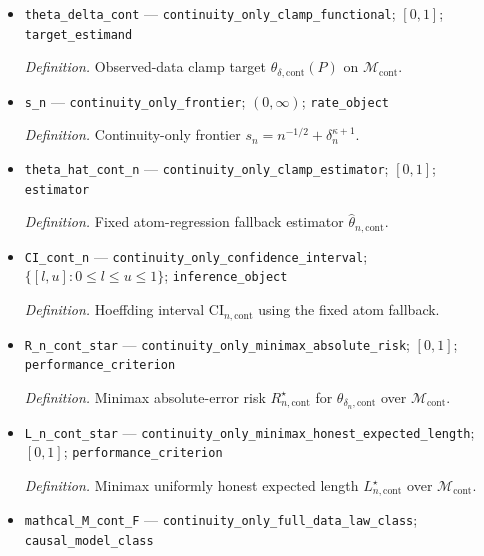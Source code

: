 \documentclass{article}
\begin{document}
\begin{itemize}
  \item \texttt{theta\_\allowbreak{}delta\_\allowbreak{}cont} --- \texttt{continuity\_\allowbreak{}only\_\allowbreak{}clamp\_\allowbreak{}functional}; \([0,1]\); \texttt{target\_\allowbreak{}estimand}
  \par\smallskip\noindent\emph{Definition.} Observed-data clamp target \(\theta_{\delta,\mathrm{cont}}(P)\) on \(\mathcal M_{\mathrm{cont}}\).
  \item \texttt{s\_\allowbreak{}n} --- \texttt{continuity\_\allowbreak{}only\_\allowbreak{}frontier}; \((0,\infty)\); \texttt{rate\_\allowbreak{}object}
  \par\smallskip\noindent\emph{Definition.} Continuity-only frontier \(s_n=n^{-1/2}+\delta_n^{\kappa+1}\).
  \item \texttt{theta\_\allowbreak{}hat\_\allowbreak{}cont\_\allowbreak{}n} --- \texttt{continuity\_\allowbreak{}only\_\allowbreak{}clamp\_\allowbreak{}estimator}; \([0,1]\); \texttt{estimator}
  \par\smallskip\noindent\emph{Definition.} Fixed atom-regression fallback estimator \(\widehat\theta_{n,\mathrm{cont}}\).
  \item \texttt{CI\_\allowbreak{}cont\_\allowbreak{}n} --- \texttt{continuity\_\allowbreak{}only\_\allowbreak{}confidence\_\allowbreak{}interval}; \(\{[l,u]:0\leq l\leq u\leq1\}\); \texttt{inference\_\allowbreak{}object}
  \par\smallskip\noindent\emph{Definition.} Hoeffding interval \(\mathrm{CI}_{n,\mathrm{cont}}\) using the fixed atom fallback.
  \item \texttt{R\_\allowbreak{}n\_\allowbreak{}cont\_\allowbreak{}star} --- \texttt{continuity\_\allowbreak{}only\_\allowbreak{}minimax\_\allowbreak{}absolute\_\allowbreak{}risk}; \([0,1]\); \texttt{performance\_\allowbreak{}criterion}
  \par\smallskip\noindent\emph{Definition.} Minimax absolute-error risk \(R_{n,\mathrm{cont}}^\star\) for \(\theta_{\delta_n,\mathrm{cont}}\) over \(\mathcal M_{\mathrm{cont}}\).
  \item \texttt{L\_\allowbreak{}n\_\allowbreak{}cont\_\allowbreak{}star} --- \texttt{continuity\_\allowbreak{}only\_\allowbreak{}minimax\_\allowbreak{}honest\_\allowbreak{}expected\_\allowbreak{}length}; \([0,1]\); \texttt{performance\_\allowbreak{}criterion}
  \par\smallskip\noindent\emph{Definition.} Minimax uniformly honest expected length \(L_{n,\mathrm{cont}}^\star\) over \(\mathcal M_{\mathrm{cont}}\).
  \item \texttt{mathcal\_\allowbreak{}M\_\allowbreak{}cont\_\allowbreak{}F} --- \texttt{continuity\_\allowbreak{}only\_\allowbreak{}full\_\allowbreak{}data\_\allowbreak{}law\_\allowbreak{}class}; \texttt{causal\_\allowbreak{}model\_\allowbreak{}class}

\end{itemize}
\end{document}
